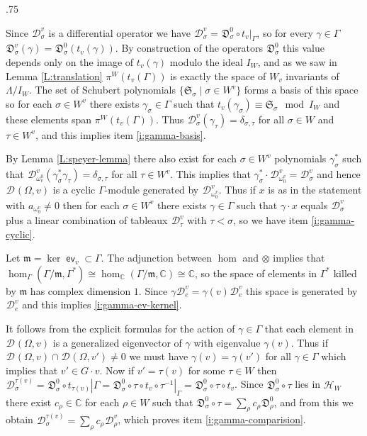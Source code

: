 \documentclass[11pt,fleqn]{amsart}
\makeatletter
\renewcommand\proofname{Proof}
\renewenvironment{proof}[1][\textit{\proofname}]{\par
 \pushQED{\qed}%
 \normalfont \topsep.75\paraskip\relax
 \trivlist
 \item[\hskip\labelsep
 \itshape
 #1\@addpunct{.}]\ignorespaces
}{%
 \popQED\endtrivlist\@endpefalse
}
\newcounter{para}[section]
\newcommand\CC{\mathbb C}
\newcommand\D[3]{{}^{#1} \mathfrak D_{#2}^{#3}}
\newcommand\DD[3]{{}^{#1} \mathcal D_{#2}^{#3}}
\newcommand\m{\mathfrak m}
\renewcommand\SS{\mathfrak S}
\DeclareMathOperator\ev{\mathsf{ev}}
\makeatother
\begin{document}
\begin{proof}
Since $\DD{}{\sigma}{v}$ is a differential operator we have $\DD{}{\sigma}{v}
= \D{}{\sigma}{0} \circ t_v |_\Gamma$, so for every $\gamma \in \Gamma$
$\D{}{\sigma}{v}(\gamma) = \D{}{\sigma}{0}(t_v(\gamma))$. By construction of
the operators $\D{}{\sigma}{0}$ this value depends only on the image of 
$t_v(\gamma)$ modulo the ideal $I_W$, and as we saw in Lemma 
\ref{L:translation} $\pi^W(t_v(\Gamma))$ is exactly the space of $W_v$ 
invariants of $\Lambda/I_W$. The set of Schubert polynomials $\{\SS_\sigma 
\mid \sigma \in W^v\}$ forms a basis of this space so for each $\sigma \in W^v$
there exists $\gamma_\sigma \in \Gamma$ such that $t_v(\gamma_\sigma) \equiv 
\SS_\sigma \mod I_W$ and these elements span $\pi^W(t_v(\Gamma))$. Thus
$\DD{}{\sigma}{v}(\gamma_\tau) = \delta_{\sigma,\tau}$ for all $\sigma \in W$
and $\tau \in W^v$, and this implies item \ref{i:gamma-basis}.

By Lemma \ref{L:speyer-lemma} there also exist for each $\sigma \in W^v$ 
polynomials $\gamma_\sigma^*$ such that $\DD{}{\omega_v^0}{v}(\gamma_\sigma^*
\gamma_\tau) = \delta_{\sigma,\tau}$ for all $\tau \in W^v$. This implies that
$\gamma_\sigma^* \cdot \DD{}{\omega_0^v}{v} = \DD{}{\sigma}{v}$ and hence 
$\DD{}{}{} (\Omega, v)$ is a cyclic $\Gamma$-module generated by 
$\DD{}{\omega_0^v}{v}$. Thus if $x$ is as in the statement with $a_{\omega_0^v}
\neq 0$ then for each $\sigma \in W^v$ there exists $\gamma \in \Gamma$ such
that $\gamma \cdot x$ equals $\DD{}{\sigma}{v}$ plus a linear combination of
tableaux $\DD{}{\tau}{v}$ with $\tau < \sigma$, so we have item 
\ref{i:gamma-cyclic}. 

Let $\m = \ker \ev_{v} \subset \Gamma$. The adjunction between $\hom$ and 
$\otimes$ implies that $\hom_\Gamma(\Gamma / \m, \Gamma^*) \cong 
\hom_\CC(\Gamma/\m, \CC) \cong \CC$, so the space of elements in $\Gamma^*$
killed by $\m$ has complex dimension $1$. Since $\gamma \DD{}{e}{v} = 
\gamma(v) \DD{}{e}{v}$ this space is generated by $\DD{}{e}{v}$ and this 
implies \ref{i:gamma-ev-kernel}. 

It follows from the explicit formulas for the action of $\gamma \in \Gamma$ 
that each element in $\DD{}{}{}(\Omega, v)$ is a generalized eigenvector of 
$\gamma$ with eigenvalue $\gamma(v)$. Thus if $\DD{}{}{}(\Omega, v) \cap 
\DD{}{}{}(\Omega, v') \neq 0$ we must have $\gamma(v) = \gamma(v')$ for all
$\gamma \in \Gamma$ which implies that $v' \in G \cdot v$. Now if $v' = 
\tau(v)$ for some $\tau \in W$ then $\DD{}{\sigma}{\tau(v)} = \D{}{\sigma}{0}
\circ t_{\tau(v)}|\Gamma = \D{}{\sigma}{0} \circ \tau \circ t_v \circ \tau^{-1}
|_\Gamma = \D{}{\sigma}{0} \circ \tau \circ t_v$. Since $\D{}{\sigma}{0} 
\circ \tau$ lies in $\mathcal H_W$ there exist $c_\rho \in \CC$ for each $\rho
\in W$ such that $\D{}{\sigma}{0} \circ \tau = \sum_\rho c_\rho \D{}{\rho}{0}$,
and from this we obtain $\DD{}{\sigma}{\tau(v)} = \sum_\rho 
c_\rho \DD{}{\rho}{v}$, which proves item \ref{i:gamma-comparision}.
\end{proof}
\end{document}
